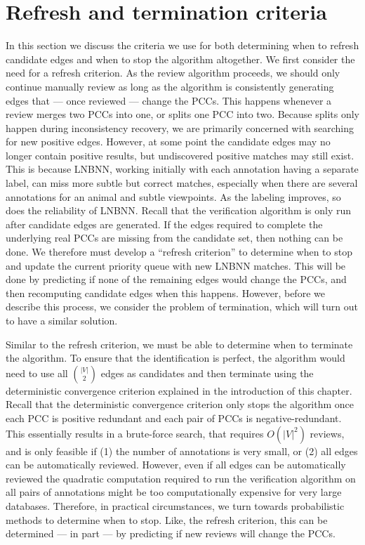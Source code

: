 \section{Refresh and termination criteria}\label{sec:converge}


In this section we discuss the criteria we use for both determining when to refresh candidate edges and when to
  stop the algorithm altogether.
We first consider the need for a refresh criterion.
As the review algorithm proceeds, we should only continue manually review as long as the algorithm is
  consistently generating edges that --- once reviewed --- change the PCCs.
This happens whenever a review merges two PCCs into one, or splits one PCC into two.
Because splits only happen during inconsistency recovery, we are primarily concerned with searching for new
  positive edges.
However, at some point the candidate edges may no longer contain positive results, but undiscovered positive
  matches may still exist.
This is because LNBNN, working initially with each annotation having a separate label, can miss more subtle but
  correct matches, especially when there are several annotations for an animal and subtle viewpoints.
As the labeling improves, so does the reliability of LNBNN.
Recall that the verification algorithm is only run after candidate edges are generated.
If the edges required to complete the underlying real PCCs are missing from the candidate set, then nothing can
  be done.
We therefore must develop a ``refresh criterion'' to determine when to stop and update the current priority queue
  with new LNBNN matches.
This will be done by predicting if none of the remaining edges would change the PCCs, and then recomputing
  candidate edges when this happens.
However, before we describe this process, we consider the problem of termination, which will turn out to have a
  similar solution.

Similar to the refresh criterion, we must be able to determine when to terminate the algorithm.
To ensure that the identification is perfect, the algorithm would need to use all $\binom{|V|}{2}$ edges as
  candidates and then terminate using the deterministic convergence criterion explained in the introduction of this
  chapter.
Recall that the deterministic convergence criterion only stops the algorithm once each PCC is positive redundant
  and each pair of PCCs is negative-redundant.
This essentially results in a brute-force search, that requires $O(|V|^2)$ reviews, and is only feasible if
(1) the number of annotations is very small, or
(2) all edges can be automatically reviewed.
However, even if all edges can be automatically reviewed the quadratic computation required to run the
  verification algorithm on all pairs of annotations might be too computationally expensive for very large
  databases.
Therefore, in practical circumstances, we turn towards probabilistic methods to determine when to stop.
Like, the refresh criterion, this can be determined --- in part --- by predicting if new reviews will change the
  PCCs.

